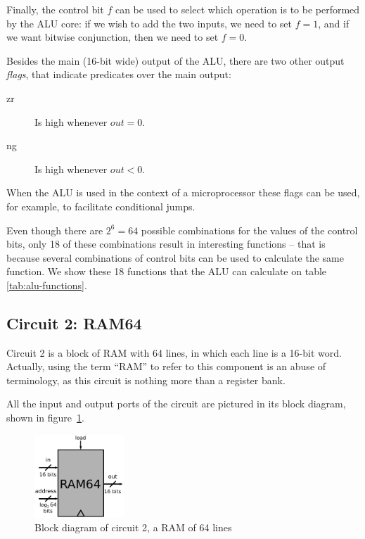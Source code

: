         Finally, the control bit $f$ can be used to select which operation is to be performed by the
        ALU core: if we wish to add the two inputs, we need to set $f = 1$, and if we want bitwise
        conjunction, then we need to set $f = 0$.

        Besides the main (16-bit wide) output of the ALU, there are two other output \emph{flags},
        that indicate predicates over the main output:

        \begin{description}
            \item[zr] Is high whenever $out = 0$.
            \item[ng] Is high whenever $out < 0$.
        \end{description}

        When the ALU is used in the context of a microprocessor these flags can be used, for
        example, to facilitate conditional jumps.

        Even though there are $2^{6} = 64$ possible combinations for the values of the control bits,
        only 18 of these combinations result in interesting functions -- that is because several
        combinations of control bits can be used to calculate the same function. We show these 18
        functions that the ALU can calculate on table \ref{tab:alu-functions}.
        



    \subsection{Circuit 2: RAM64}
    \label{subsec:ram-circuit}

        Circuit 2 is a block of RAM with 64 lines, in which each line is a 16-bit word.  Actually,
        using the term ``RAM'' to refer to this component is an abuse of terminology, as this
        circuit is nothing more than a register bank.

        All the input and output ports of the circuit are pictured in its block diagram, shown
        in figure~\ref{fig:ram-block}.

        \begin{figure}[h!]
            \centerline{\includegraphics[width=0.3\textwidth]{imgs/ram-block.pdf}}
            \caption{Block diagram of circuit 2, a RAM of 64 lines
                \label{fig:ram-block}}
        \end{figure}


